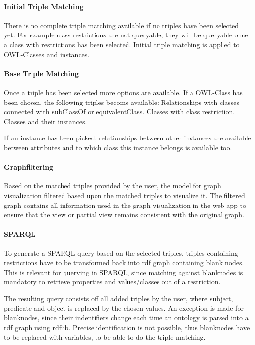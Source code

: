 \paragraph*{Initial Triple Matching}
There is no complete triple matching available if no triples have been selected yet. For example class restrictions are not queryable, they will be queryable once a class
with restrictions has been selected. Initial triple matching is applied to OWL-Classes and instances.

\paragraph*{Base Triple Matching} 
Once a triple has been selected more options are available. 
If a OWL-Class has been chosen, the following triples become available:
Relationships with classes connected with subClassOf or equivalentClass.
Classes with class restriction. 
Classes and their instances. 

If an instance has been picked, relationships between other instances are available
between attributes and to which class this instance belongs is available too.

\paragraph*{Graphfiltering}
Based on the matched triples provided by the user, the model for graph visualization filtered based upon 
the matched triples to visualize it. The filtered graph contains all information used in the graph visualization in 
the web app to ensure that the view or partial view remains consistent with the original graph.

\paragraph*{SPARQL}
To generate a SPARQL query based on the selected triples, triples containing restrictions have to be transformed back into 
rdf graph containing blank nodes. This is relevant for querying in SPARQL, since matching against blanknodes is mandatory to retrieve 
properties and values/classes out of a restriction. 

The resulting query consists off all added triples by the user, where subject, predicate and object is replaced by the 
chosen values. An exception is made for blanknodes, since their indentifiers change each time an ontology is parsed into 
a rdf graph using rdflib. Precise identification is not possible, thus blanknodes have to be replaced with variables, to 
be able to do the triple matching.







